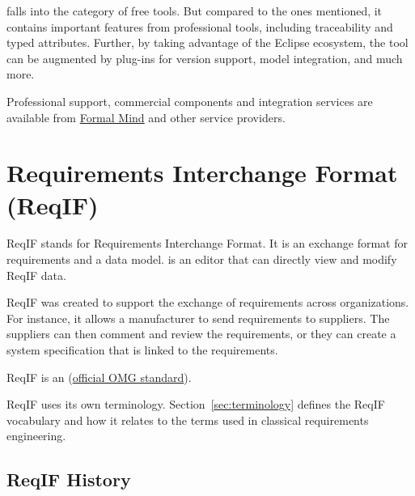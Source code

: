 \pror{} falls into the category of free tools.  But compared to the ones mentioned, it contains important features from professional tools, including traceability and typed attributes.  Further, by taking advantage of the Eclipse ecosystem, the tool can be augmented by plug-ins for version support, model integration, and much more.

\begin{info}
  Professional support, commercial components and integration services are available from \href{http://formalmind.com}{Formal Mind} and other service providers.
\end{info}


\section{Requirements Interchange Format (ReqIF)}
\label{sec:reqif}

ReqIF stands for Requirements Interchange Format.  It is an exchange format for requirements and a data model.  \pror{} is an editor that can directly view and modify ReqIF data.

ReqIF was created to support the exchange of requirements across organizations.  For instance, it allows a manufacturer to send requirements to suppliers.  The suppliers can then comment and review the requirements, or they can create a system specification that is linked to the requirements.

ReqIF is an (\href{http://www.omg.org/spec/ReqIF/}{official OMG standard}).

\begin{warning}
ReqIF uses its own terminology.  Section~\ref{sec:terminology} defines the ReqIF vocabulary and how it relates to the terms used in classical requirements engineering.
\end{warning}

\subsection{ReqIF History}
\label{sec:history}

